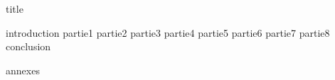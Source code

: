\documentclass[a4paper,11pt,final]{report}
\begin{document}
  \renewcommand{\contentsname}{Sommaire}  %
   {title}
  
  \tableofcontents %
  \thispagestyle{fancy}
  \listoffigures
  \thispagestyle{fancy}
   {introduction}
   {partie1}
   {partie2}
   {partie3}
   {partie4}
   {partie5}
   {partie6}
   {partie7}
   {partie8}
   {conclusion}
  
  
   {annexes}
\end{document}
